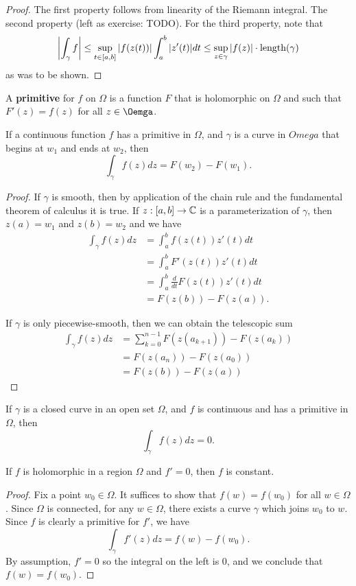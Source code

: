 \documentclass{exam}
\begin{document}
\begin{proof}
    The first property follows from linearity of the Riemann integral. The second property (left as exercise: TODO). For the third property,
    note that
    $$\left| \int_\gamma f \right| \leq \sup_{t\in[a, b]}\left| f(z(t)) \right|\int_a^b |z'(t)|dt \leq \sup_{z\in\gamma} \left| f(z) \right| \cdot \text{length}(\gamma)$$
    as was to be shown.
\end{proof}

A \textbf{primitive} for $f$ on $\Omega$ is a function $F$ that is holomorphic on $\Omega$ and such that $F'(z) = f(z)$ for all $z\in\Oemga$. 
\noqed
\begin{theorem}\label{thm:main}
    If a continuous function $f$ has a primitive in $\Omega$, and $\gamma$ is a curve in $Omega$ that begins at $w_1$ and ends at $w_2$, then
    $$\int_\gamma f(z) dz = F(w_2) - F(w_1).$$
\end{theorem}
\yesqed
\begin{proof}
    If $\gamma$ is smooth, then by application of the chain rule and the fundamental theorem of calculus it is true. If $z: [a, b]\to\mathbb{C}$
    is a parameterization of $\gamma$, then $z(a) = w_1$ and $z(b) = w_2$ and we have
    \begin{align*}
        \int_\gamma f(z)dz &= \int_a^b f(z(t))z'(t)dt \\
        &= \int_a^b F'(z(t))z'(t)dt \\
        &= \int_a^b \frac{d}{dt} F(z(t))z'(t)dt \\
        &= F(z(b)) - F(z(a)).
    \end{align*}

    If $\gamma$ is only piecewise-smooth, then we can obtain the telescopic sum
    \begin{align*}
        \int_\gamma f(z)dz &= \sum_{k = 0}^{n - 1}F(z(a_{k + 1})) - F(z(a_k)) \\
        &= F(z(a_n)) - F(z(a_0)) \\
        &= F(z(b)) - F(z(a))
    \end{align*}
\end{proof}

\noqed
\begin{corollary}
    If $\gamma$ is a closed curve in an open set $\Omega$, and $f$ is continuous and has a primitive in $\Omega$, then 
    $$\int_\gamma f(z) dz = 0.$$
\end{corollary}
\begin{corollary}
    If $f$ is holomorphic in a region $\Omega$ and $f' = 0$, then $f$ is constant.
\end{corollary}
\yesqed
\begin{proof}
    Fix a point $w_0\in\Omega$. It suffices to show that $f(w) = f(w_0)$ for all $w\in\Omega$. Since $\Omega$ is connected, for any $w\in\Omega$,
    there exists a curve $\gamma$ which joins $w_0$ to $w$. Since $f$ is clearly a primitive for $f'$, we have
    $$\int_\gamma f'(z)dz = f(w) - f(w_0).$$
    By assumption, $f' = 0$ so the integral on the left is 0, and we conclude that $f(w) = f(w_0)$.
\end{proof}
\end{document}
